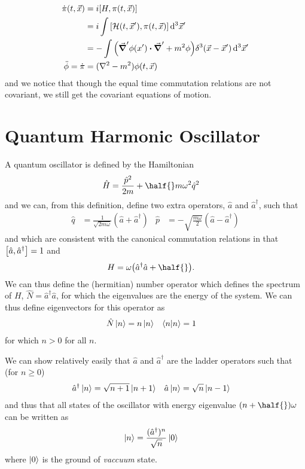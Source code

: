 \documentclass[notes.tex]{subfiles}
\begin{document}
\begin{align*}
    \dot{\pi}(t, \vec{x}) &= i\commutator{H}{\pi(t, \vec{x})}\\
    &= i \int \commutator{\mathcal{H}(t, \vec{x}^\prime)}{\pi(t, \vec{x})}\dd[3]{\vec{x}^\prime}\\
    &= - \int \qty(\grad^\prime\phi(x^\prime)\vdot\grad^\prime + m^2 \phi)\delta^3(\vec{x} - \vec{x}^\prime)  \dd[3]{\vec{x}^\prime}\\
    \ddot{\phi} = \dot{\pi} &= (\laplacian-m^2)\phi(t, \vec{x})
\end{align*}
and we notice that though the equal time commutation relations are not covariant, we still get the covariant equations of motion.

\section{Quantum Harmonic Oscillator}
A quantum oscillator is defined by the Hamiltonian
\begin{align*}
    \hat{H} &= \frac{\hat{p}^2}{2m} + \half{} m \omega^2 \hat{q}^2
\end{align*}
and we can, from this definition, define two extra operators, $\hat{a}$ and $\hat{a}^\dagger$, such that
\begin{align*}
    \hat{q} &= \frac{1}{\sqrt{2m\omega}}(\hat{a} + \hat{a}^\dagger) & \hat{p} &= -\sqrt{\frac{m\omega}{2}} (\hat{a} - \hat{a}^\dagger)
\end{align*}
and which are consistent with the canonical commutation relations in that
    $\commutator{\hat{a}}{\hat{a}^\dagger} = 1$
and
\begin{align*}
    H &= \omega\qty(\hat{a}^\dagger\hat{a} + \half{}).
\end{align*}
We can thus define the (hermitian) number operator which defines the spectrum of $H$, $\hat{N} = \hat{a}^\dagger\hat{a}$, for which the eigenvalues are the energy of the system.
We can thus define eigenvectors for this operator as 
\begin{align*}
    \hat{N}\ket{n} &= n\ket{n} & \braket{n}{n} &= 1
\end{align*}
for which $n>0$ for all $n$.

We can show relatively easily that $\hat{a}$ and $\hat{a}^\dagger$ are the ladder operators such that (for $n\geq 0$)
\begin{align*}
    \hat{a}^\dagger \ket{n} &= \sqrt{n+1}\ket{n+1} & \hat{a}\ket{n} &= \sqrt{n}\ket{n-1}
\end{align*}
and thus that all states of the oscillator with energy eigenvalue $(n+\half{})\omega$ can be written as 
\begin{align*}
    \ket{n} &= \frac{(\hat{a}^\dagger)^n}{\sqrt{n}}\ket{0}
\end{align*}
where $\ket{0}$ is the ground of \emph{vaccuum} state.
\end{document}
